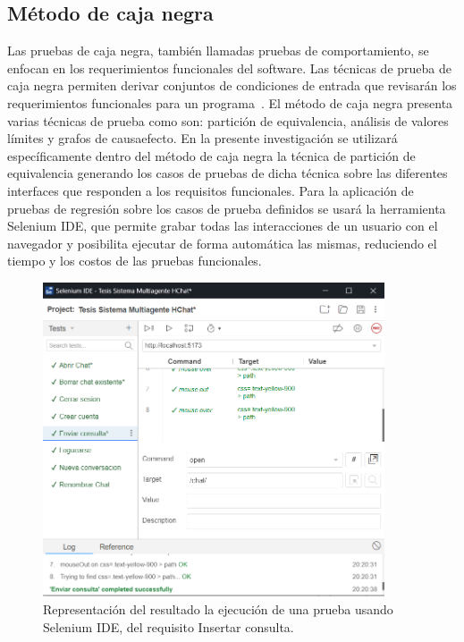 \subsection{Método de caja negra}
Las pruebas de caja negra, también llamadas pruebas de comportamiento, se enfocan en los requerimientos funcionales del software. Las técnicas de prueba de caja negra permiten derivar conjuntos de condiciones de entrada que revisarán los requerimientos funcionales para un programa~\cite{pressman2010practitioner}. El método de caja negra presenta varias técnicas de prueba como son: partición de equivalencia, análisis de valores límites y grafos de causaefecto.
En la presente investigación se utilizará específicamente dentro del método de caja negra la técnica de partición de equivalencia generando los casos de pruebas de dicha técnica
sobre las diferentes interfaces que responden a los requisitos funcionales. Para la aplicación de pruebas de regresión sobre los casos de prueba definidos se usará la herramienta Selenium IDE, que permite grabar todas las interacciones de un usuario con el
navegador y posibilita ejecutar de forma automática las mismas, reduciendo el tiempo y los costos de las pruebas funcionales.

\begin{figure}[htbp] %
	\centering
	\includegraphics[width=0.9\textwidth]{images/Pruebas_funcionales.PNG} 
	\caption{Representación del resultado la ejecución de una prueba usando Selenium IDE, del requisito Insertar consulta.}
	\label{fig:unit_test}
\end{figure}

